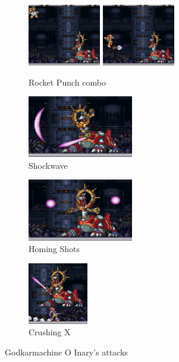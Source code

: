 \begin{figure}[htp]
	\centering
	\begin{subfigure}{\linewidth}
		\centering
		\includegraphics[height=2.7cm]{figures/X3/Doppler_stages/gkarma_punch_1.jpg}
		\includegraphics[height=2.7cm]{figures/X3/Doppler_stages/gkarma_punch_2.jpg}
		\caption{Rocket Punch combo}
	\end{subfigure}
	\begin{subfigure}{.4\linewidth}
		\centering
		\includegraphics[height=2.7cm]{figures/X3/Doppler_stages/gkarma_saber.jpg}
		\caption{Shockwave}
	\end{subfigure}
	\begin{subfigure}{.4\linewidth}
		\centering
		\includegraphics[height=2.7cm]{figures/X3/Doppler_stages/gkarma_sphere.jpg}
		\caption{Homing Shots}
	\end{subfigure}
	\begin{subfigure}{\linewidth}
		\centering
		\includegraphics[height=2.7cm]{figures/X3/Doppler_stages/gkarma_crush.jpg}
		\caption{Crushing X}
	\end{subfigure}
	\caption{Godkarmachine O Inary's attacks}
\end{figure}

